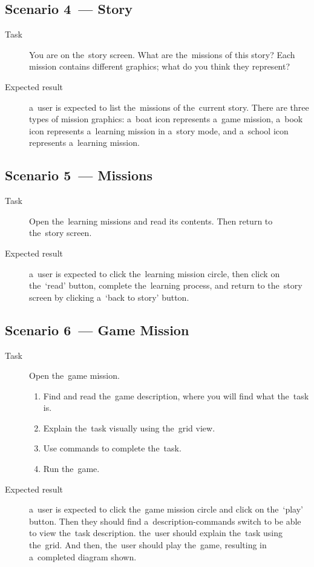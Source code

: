 \subsection*{Scenario 4~--- Story}

\begin{description}
    \item[Task] You are on the~story screen.
    What are the~missions of this story?
    Each mission contains different graphics; what do you think they represent?
    \item[Expected result] a~user is expected to list the~missions of the~current story.
    There are three types of mission graphics: a~boat icon represents a~game mission, a~book icon represents a~learning mission in a~story mode, and a~school icon represents a~learning mission.
\end{description}

\subsection*{Scenario 5~--- Missions}

\begin{description}
    \item[Task] Open the~learning missions and read its contents.
    Then return to the~story screen.
    \item[Expected result] a~user is expected to click the~learning mission circle, then click on the~\enquote*{read} button, complete the~learning process, and return to the~story screen by clicking a~\enquote*{back to story} button.
\end{description}

\subsection*{Scenario 6~--- Game Mission}

\begin{description}
    \item[Task] Open the~game mission.
    \begin{enumerate}
        \item Find and read the~game description, where you will find what the~task is.
        \item Explain the~task visually using the~grid view.
        \item Use commands to complete the~task.
        \item Run the~game.
    \end{enumerate}
    \item[Expected result] a~user is expected to click the~game mission circle and click on the~\enquote*{play} button.
    Then they should find a~description-commands switch to be able to view the~task description.
    the~user should explain the~task using the~grid.
    And then, the~user should play the~game, resulting in a~completed diagram shown.
\end{description}

